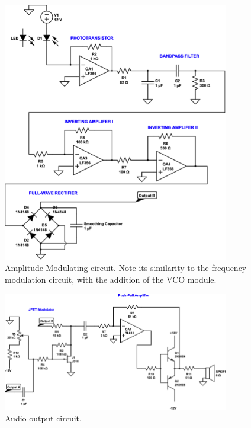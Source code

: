 \documentclass[twocolumn]{article}
\begin{document}
\begin{figure}[h!]
 \centering
\includegraphics[width=280pt]{figure/amp_circuit}
\caption{Amplitude-Modulating circuit. Note its similarity to the frequency modulation circuit, with the addition of the VCO module. }
\label{amp_circuit}
\end{figure}
\begin{figure}
 \centering
\includegraphics[width=280pt]{figure/audio_circuit}
\caption{Audio output circuit.}
\label{audio_circuit}
\end{figure}
\end{document}
